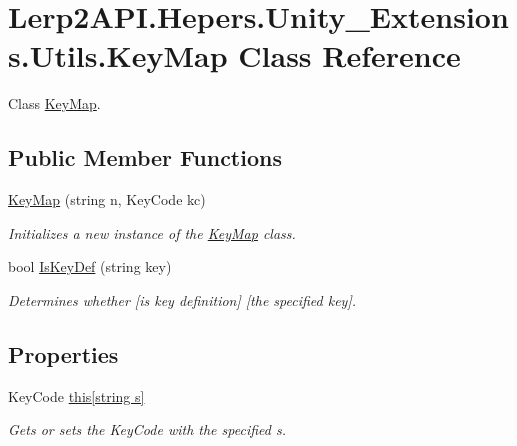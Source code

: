 \hypertarget{class_lerp2_a_p_i_1_1_hepers_1_1_unity___extensions_1_1_utils_1_1_key_map}{}\section{Lerp2\+A\+P\+I.\+Hepers.\+Unity\+\_\+\+Extensions.\+Utils.\+Key\+Map Class Reference}
\label{class_lerp2_a_p_i_1_1_hepers_1_1_unity___extensions_1_1_utils_1_1_key_map}


Class \hyperlink{class_lerp2_a_p_i_1_1_hepers_1_1_unity___extensions_1_1_utils_1_1_key_map}{Key\+Map}.  


\subsection*{Public Member Functions}
\begin{DoxyCompactItemize}
\item 
\hyperlink{class_lerp2_a_p_i_1_1_hepers_1_1_unity___extensions_1_1_utils_1_1_key_map_a66a75dde8b1c2f34712371a1a2175078}{Key\+Map} (string n, Key\+Code kc)
\begin{DoxyCompactList}\small\item\em Initializes a new instance of the \hyperlink{class_lerp2_a_p_i_1_1_hepers_1_1_unity___extensions_1_1_utils_1_1_key_map}{Key\+Map} class. \end{DoxyCompactList}\item 
bool \hyperlink{class_lerp2_a_p_i_1_1_hepers_1_1_unity___extensions_1_1_utils_1_1_key_map_a963623fa411d03fd387c47933afc74bb}{Is\+Key\+Def} (string key)
\begin{DoxyCompactList}\small\item\em Determines whether \mbox{[}is key definition\mbox{]} \mbox{[}the specified key\mbox{]}. \end{DoxyCompactList}\end{DoxyCompactItemize}
\subsection*{Properties}
\begin{DoxyCompactItemize}
\item 
Key\+Code \hyperlink{class_lerp2_a_p_i_1_1_hepers_1_1_unity___extensions_1_1_utils_1_1_key_map_ae7b6c3c128e62b05a44bfb573025f06e}{this\mbox{[}string s\mbox{]}}
\begin{DoxyCompactList}\small\item\em Gets or sets the Key\+Code with the specified s. \end{DoxyCompactList}\end{DoxyCompactItemize}


